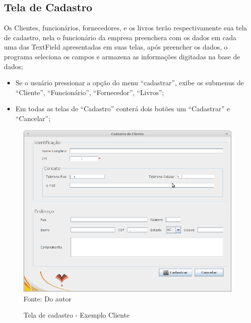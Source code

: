 \subsection{Tela de Cadastro}

Os Clientes, funcionários, fornecedores, e os livros terão respectivamente sua tela de cadastro, nela o funcionário 
da empresa preenchera com os dados em cada uma das TextField apresentadas em suas telas, após preencher os dados, o 
programa seleciona os campos e armazena as informações digitadas na base de dados;

\begin{itemize}
 \item Se o usuário pressionar a opção do menu “cadastrar”, exibe os submenus de “Cliente”, “Funcionário”, “Fornecedor”, “Livros”;
 \item Em todas as telas de “Cadastro” conterá dois botões um “Cadastrar” e “Cancelar”;
\end{itemize}

 \begin{figure}[H]
	\centering 
	\caption{Tela de cadastro - Exemplo Cliente}
	\label{cadastro_cliente}
	\includegraphics[scale = 0.5]{imagens/cadastro-cliente.png}
	\\Fonte: Do autor
\end{figure}

